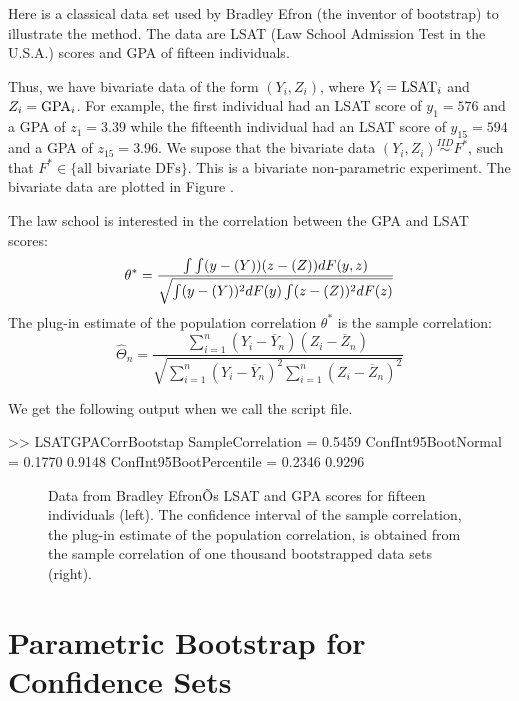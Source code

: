 \begin{labwork}\label{LW:LSATGPACorrBoot}
Here is a classical data set used by Bradley Efron (the inventor of bootstrap) to illustrate the method.  The data are LSAT (Law School Admission Test in the U.S.A.) scores and GPA of fifteen individuals.

Thus, we have bivariate data of the form $(Y_i,Z_i)$, where $Y_i={\rm LSAT}_i$ and $Z_i={\rm GPA}_i$.  For example, the first individual had an LSAT score of  $y_1=576$ and a GPA of $z_1=3.39$ while the fifteenth individual had an LSAT score of $y_{15}=594$ and a GPA of $z_{15}=3.96$.  We supose that the bivariate data $(Y_i,Z_i) \overset{IID}{\sim} F^*$, such that $F^* \in \{ \text{all bivariate DFs} \}$.  This is a bivariate non-parametric experiment.  The bivariate data are plotted in Figure .


The law school is interested in the correlation between the GPA and LSAT scores:
$$
\theta^* = \frac{\int \int (y-\mathscr{(}Y))(z-\mathscr{(}Z))dF(y,z)}{\sqrt{\int (y-\mathscr{(}Y))^2 dF(y) \int (z-\mathscr{(}Z))^2 dF(z)}}
$$
The plug-in estimate of the population correlation $\theta^*$ is the sample correlation:
$$
\widehat{\Theta}_n = \frac{\sum_{i=1}^n(Y_i-\overline{Y}_n)(Z_i-\overline{Z}_n)}{\sqrt{\sum_{i=1}^n(Y_i-\overline{Y}_n)^2 \sum_{i=1}^n(Z_i-\overline{Z}_n)^2}}
$$ 

We get the following output when we call the script file.
\begin{VrbM}
>> LSATGPACorrBootstap
SampleCorrelation =    0.5459
ConfInt95BootNormal =    0.1770    0.9148
ConfInt95BootPercentile =    0.2346    0.9296
\end{VrbM}

\begin{figure}
\caption{Data from Bradley EfronÕs LSAT and GPA scores for fifteen individuals (left).  The confidence interval of the sample correlation, the plug-in estimate of the population correlation, is obtained from the sample correlation of one thousand bootstrapped data sets (right).\label{F:LSATGPACorrBootstrap}}
\begin{center}
\end{center}
\end{figure}

\end{labwork}

\section{Parametric Bootstrap for Confidence Sets}\label{S:PBootstrap}

